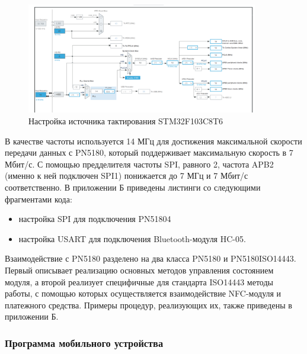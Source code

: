 \begin{figure}[H]
    \centering
    \includegraphics[width=0.9\textwidth]{images/design/stm_cube}
    \caption{\centering Настройка источника тактирования STM32F103C8T6}
    \label{fig:stm_cube}
\end{figure}

В качестве частоты используется 14 МГц для достижения максимальной скорости передачи данных с PN5180, который поддерживает максимальную скорость в 7 Мбит/с.
С помощью предделителя частоты SPI, равного 2, частота APB2 (именно к ней подключен SPI1) понижается до 7 МГц и 7 Мбит/с соответственно.
В приложении Б приведены листинги со следующими фрагментами кода:
\begin{itemize}
    \item настройка SPI для подключения PN51804
    \item настройка USART для подключения Bluetooth-модуля HC-05.
\end{itemize}

Взаимодействие с PN5180 разделено на два класса PN5180 и PN5180ISO14443.
Первый описывает реализацию основных методов управления состоянием модуля, а второй реализует специфичные для стандарта ISO14443 методы работы, с помощью которых осуществляется взаимодействие NFC-модуля и платежного средства.
Примеры процедур, реализующих их, также приведены в приложении Б.


\subsubsection{Программа мобильного устройства}
